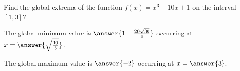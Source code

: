 \documentclass{ximera}
\begin{document}
\begin{exercise}

Find the global extrema of the function $f(x) = x^3-10x+1$ on the interval
$[1,3]$?

The global minimum value is $\answer{1-\frac{20\sqrt{30}}{9}}$ occurring at $x = \answer{\sqrt{\frac{10}{3}}}$.


The global maximum value is $\answer{-2}$ occurring at $x = \answer{3}$.

\end{exercise}
\end{document}
